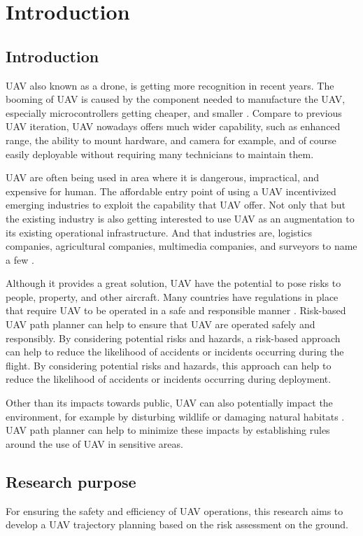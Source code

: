 \documentclass[12pt]{report}
\begin{document}
\chapter{Introduction}
    \section{Introduction}
        \ac{UAV} also known as a drone, is getting more recognition in recent years. The booming of UAV is caused by the
	    component needed to manufacture the UAV, especially microcontrollers getting cheaper, and smaller
	    \cite{austin_4_2024}. Compare to previous UAV iteration, UAV nowadays offers much wider capability, such as
	    enhanced range, the ability to mount hardware, and camera for example, and of course easily deployable without
	    requiring many technicians to maintain them.

		    UAV are often being used in area where it is dangerous, impractical, and expensive for human. The affordable
	    entry point of using a UAV incentivized emerging industries to exploit the capability that UAV offer. Not only
	    that but the existing industry is also getting interested to use UAV as an augmentation to its existing
	    operational infrastructure. And that industries are, logistics companies, agricultural companies, multimedia
	    companies, and surveyors to name a few \cite{dji_dji_2023}.

            Although it provides a great solution, UAV have the potential to pose risks to people, property, and other
        aircraft. Many countries have regulations in place that require UAV to be operated in a safe and responsible
        manner \cite{faa_ecfr_2016}. Risk-based UAV path planner can help to ensure that UAV are operated safely and
        responsibly. By considering potential risks and hazards, a risk-based approach can help to reduce the likelihood
        of accidents or incidents occurring during the flight. By considering potential risks and hazards, this approach
        can help to reduce the likelihood of accidents or incidents occurring during deployment.

            Other than its impacts towards public, UAV can also potentially impact the environment, for example by
        disturbing wildlife or damaging natural habitats \cite{holland_how_2015}. UAV path planner can help to minimize
        these impacts by establishing rules around the use of UAV in sensitive areas.
    \section{Research purpose}
        For ensuring the safety and efficiency of UAV operations, this research aims to develop a
        UAV trajectory planning based on the risk assessment on the ground.
\end{document}
